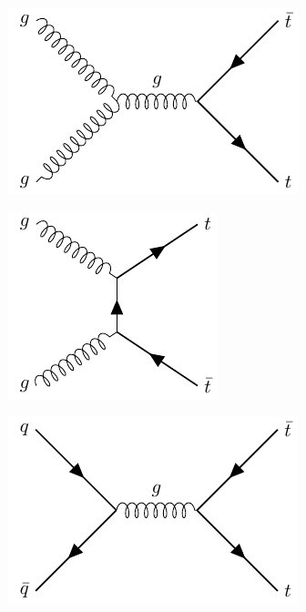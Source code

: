 \begin{figure}[h!] 
  \begin{subfigure}[b]{0.33\linewidth}
    \centering
    \includegraphics[width=\linewidth]{ubonn-thesis/Chapters/Chapters_02/Figure/ttbar_gluongluonchannel.pdf} 
  \caption{}
  \label{fig:gg1}
  \end{subfigure}%
  \begin{subfigure}[b]{0.33\linewidth}
    \centering
    \includegraphics[width=0.76\linewidth]{ubonn-thesis/Chapters/Chapters_02/Figure/ttbar_Production_tchannel.pdf} 
  \caption{}
  \label{fig:gg2}
  \end{subfigure} 
  \begin{subfigure}[b]{0.33\linewidth}
    \centering
    \includegraphics[width=\linewidth]{ubonn-thesis/Chapters/Chapters_02/Figure/ttbar_quarkquarkchannel.pdf} 

\end{subfigure}
\end{figure}
